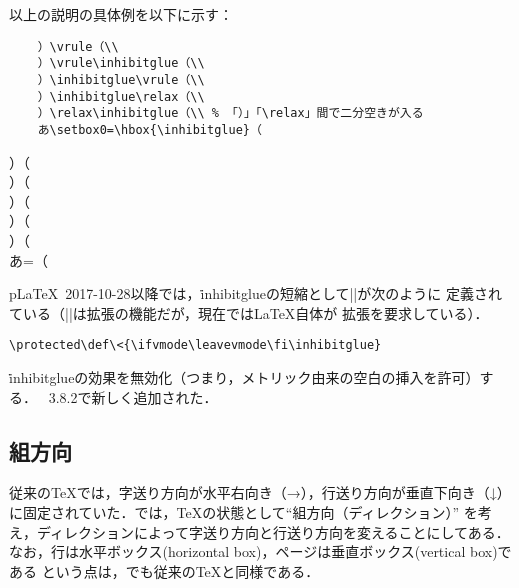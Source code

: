 \documentclass[a4paper,11pt,nomag,dvipdfmx]{jsarticle}
\begin{document}
\begin{dangerous}
  以上の説明の具体例を以下に示す：

  \medskip\noindent
  \begin{minipage}[t]{.8\linewidth}
  \begin{verbatim}
    ）\vrule（\\
    ）\vrule\inhibitglue（\\
    ）\inhibitglue\vrule（\\
    ）\inhibitglue\relax（\\
    ）\relax\inhibitglue（\\ % 「）」「\relax」間で二分空きが入る
    あ\setbox0=\hbox{\inhibitglue}（
  \end{verbatim}
  \end{minipage}\hfill
  \begin{minipage}[t]{.1\linewidth}
    ）\vrule（\\
    ）\vrule\inhibitglue（\\
    ）\inhibitglue\vrule（\\
    ）\inhibitglue\relax（\\
    ）\relax\inhibitglue（\\
    あ=\hbox{\inhibitglue}（
  \end{minipage}
\end{dangerous}
\begin{dangerous}
  p\LaTeX~2017-10-28以降では，\.{inhibitglue}の短縮として|\<|が次のように
  定義されている（|\protected|は\eTeX 拡張の機能だが，現在では\LaTeX 自体が
  \eTeX 拡張を要求している）．
\begin{verbatim}
\protected\def\<{\ifvmode\leavevmode\fi\inhibitglue}
\end{verbatim}
\end{dangerous}
\begin{cslist}
\csitem[\.{disinhibitglue}]
  \.{inhibitglue}の効果を無効化（つまり，メトリック由来の空白の挿入を許可）する．
  \pTeX~3.8.2で新しく追加された．
\end{cslist}

\subsection{組方向}
従来の\TeX では，字送り方向が水平右向き（→），行送り方向が垂直下向き（↓）
に固定されていた．\pTeX では，\TeX の状態として“組方向（ディレクション）”
を考え，ディレクションによって字送り方向と行送り方向を変えることにしてある．
なお，行は水平ボックス(horizontal box)，ページは垂直ボックス(vertical box)である
という点は，\pTeX でも従来の\TeX と同様である．
\end{document}
